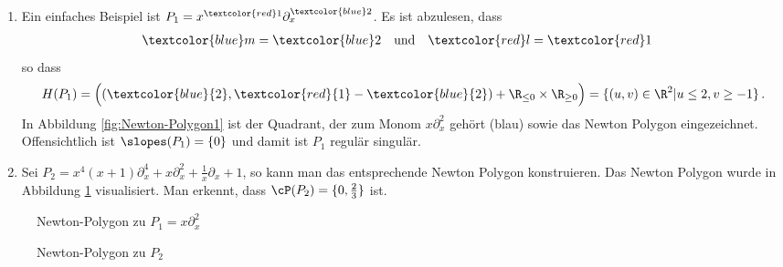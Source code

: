 \begin{exmp} \label{exmp:Newton-Polygon}
\begin{enumerate}
\item Ein einfaches Beispiel ist
$P_1=x^{\textcolor{red}1}\partial_x^{\textcolor{blue}2}$.  Es ist abzulesen,
dass
\begin{align*}
\textcolor{blue}m &= \textcolor{blue}2 &
\text{und}&&
\textcolor{red}l  &= \textcolor{red}1
\end{align*}
so dass
\[
H(P_1)=\Big( (\textcolor{blue}{2},\textcolor{red}{1}-\textcolor{blue}{2}) +
\R_{\leq 0}\times \R_{\geq 0} \Big) =\{(u,v)\in\R^2|u\leq 2, v\geq -1\} \,.
\]
In Abbildung \ref{fig:Newton-Polygon1} ist der Quadrant, der zum Monom
$x\partial_x^2$ gehört (blau) sowie das Newton Polygon eingezeichnet.
Offensichtlich ist $\slopes(P_1)=\{0\}$ und damit ist $P_1$ regulär singulär.
\item 
\begin{comment}
\cite[Bsp 5.3. 2.]{ZulaBarbara}
\end{comment}
Sei $P_2=x^4(x+1)\partial_x^4+x\partial_x^2+\frac{1}{x}\partial_x+1$, so kann
man das entsprechende Newton Polygon konstruieren.
Das Newton Polygon wurde in Abbildung \ref{fig:Newton-Polygon2} visualisiert.
Man erkennt, dass $\cP(P_2)=\{0,\frac{2}{3}\}$ ist.
\end{enumerate}
\end{exmp}
\begin{figure}[htbp]
  \begin{minipage}[hbt]{0,49\textwidth}
  \begin{center}
  \end{center}
  \caption{Newton-Polygon zu $P_1=x\partial_x^2$}
  \label{fig:Newton-Polygon1}
  \end{minipage}
  \begin{minipage}[hbt]{0,49\textwidth}
  \begin{center}
  \end{center}
  \caption{Newton-Polygon zu $P_2$}
  \label{fig:Newton-Polygon2}
  \end{minipage}
\end{figure}

